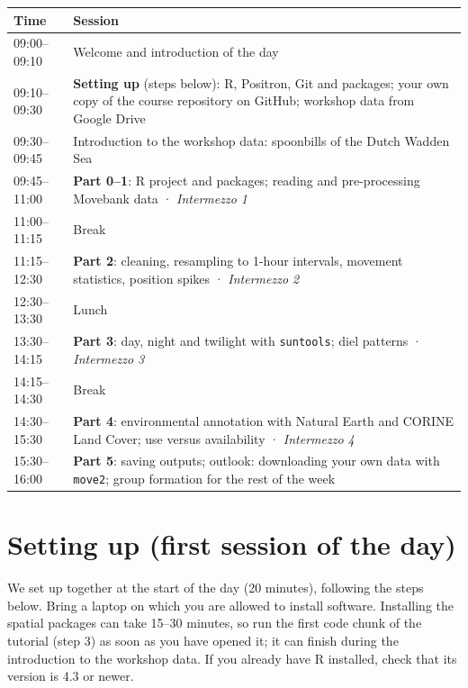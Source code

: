 \documentclass[11pt,a4paper]{article}
\begin{document}
\renewcommand{\arraystretch}{1.25}
\begin{tabularx}{\linewidth}{@{}p{2.4cm}X@{}}
\toprule
\textbf{Time} & \textbf{Session} \\
\midrule
09:00--09:10 & Welcome and introduction of the day \\
09:10--09:30 & \textbf{Setting up} (steps below): R, Positron, Git and packages; your own copy of the course repository on GitHub; workshop data from Google Drive \\
09:30--09:45 & Introduction to the workshop data: spoonbills of the Dutch Wadden Sea \\
09:45--11:00 & \textbf{Part 0--1}: R project and packages; reading and pre-processing Movebank data · \textit{Intermezzo 1} \\
11:00--11:15 & Break \\
11:15--12:30 & \textbf{Part 2}: cleaning, resampling to 1-hour intervals, movement statistics, position spikes · \textit{Intermezzo 2} \\
12:30--13:30 & Lunch \\
13:30--14:15 & \textbf{Part 3}: day, night and twilight with \texttt{suntools}; diel patterns · \textit{Intermezzo 3} \\
14:15--14:30 & Break \\
14:30--15:30 & \textbf{Part 4}: environmental annotation with Natural Earth and CORINE Land Cover; use versus availability · \textit{Intermezzo 4} \\
15:30--16:00 & \textbf{Part 5}: saving outputs; outlook: downloading your own data with \texttt{move2}; group formation for the rest of the week \\
\bottomrule
\end{tabularx}

\section{Setting up (first session of the day)}

We set up together at the start of the day (20 minutes), following the steps below. Bring a laptop on which you are allowed to install software. Installing the spatial packages can take 15--30 minutes, so run the first code chunk of the tutorial (step 3) as soon as you have opened it; it can finish during the introduction to the workshop data. If you already have R installed, check that its version is 4.3 or newer.
\end{document}
